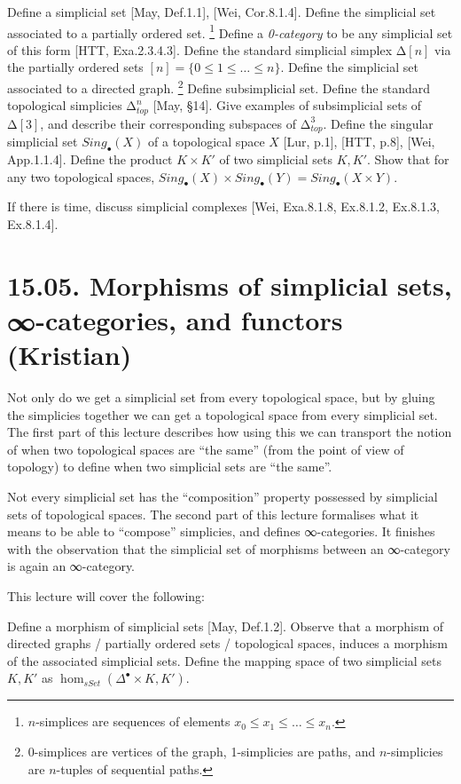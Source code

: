 \documentclass[a4paper]{amsart}
\numberwithin{figure}{section}
\theoremstyle{theorem}
\theoremstyle{definition}
\begin{document}
Define a simplicial set [May, Def.1.1], [Wei, Cor.8.1.4]. %
Define the simplicial set associated to a partially ordered set.%
\footnote{$n$-simplices are sequences of elements $x_0 \leq x_1 \leq \dots \leq x_n$.} %
Define a \emph{0-category} to be any simplicial set of this form [HTT, Exa.2.3.4.3]. %
Define the standard simplicial simplex $∆[n]$ via the partially ordered sets $[n] = \{ 0 \leq 1 \leq \dots \leq n\}$. %
Define the simplicial set associated to a directed graph.%
\footnote{0-simplices are vertices of the graph, 1-simplicies are paths, and $n$-simplicies are $n$-tuples of sequential paths.} %
Define subsimplicial set. %
Define the standard topological simplicies $∆^n_{top}$ [May, §14]. %
Give examples of subsimplicial sets of $∆[3]$, and describe their corresponding subspaces of $∆^3_{top}$. %
Define the singular simplicial set $Sing_\bullet(X)$ of a topological space $X$ [Lur, p.1], [HTT, p.8], [Wei, App.1.1.4]. %
Define the product $K \times K'$ of two simplicial sets $K, K'$. %
Show that for any two topological spaces, $Sing_\bullet(X) \times Sing_\bullet(Y) = Sing_\bullet(X \times Y)$. %

If there is time, discuss simplicial complexes [Wei, Exa.8.1.8, Ex.8.1.2, Ex.8.1.3, Ex.8.1.4].

\section{15.05. Morphisms of simplicial sets, ∞-categories, and functors (Kristian)} \label{Sec:InfCat}

Not only do we get a simplicial set from every topological space, but by gluing the simplicies together we can get a topological space from every simplicial set. The first part of this lecture describes how using this we can transport the notion of when two topological spaces are ``the same'' (from the point of view of topology) to define when two simplicial sets are ``the same''.

Not every simplicial set has the ``composition'' property possessed by simplicial sets of topological spaces. The second part of this lecture formalises what it means to be able to ``compose'' simplicies, and defines ∞-categories. It finishes with the observation that the simplicial set of morphisms between an ∞-category is again an ∞-category.

This lecture will cover the following: 

Define a morphism of simplicial sets [May, Def.1.2]. %
Observe that a morphism of directed graphs / partially ordered sets / topological spaces, induces a morphism of the associated simplicial sets. %
Define the mapping space of two simplicial sets $K, K'$ as $\hom_{sSet}(\Delta^\bullet \times K, K')$. %
\end{document}
